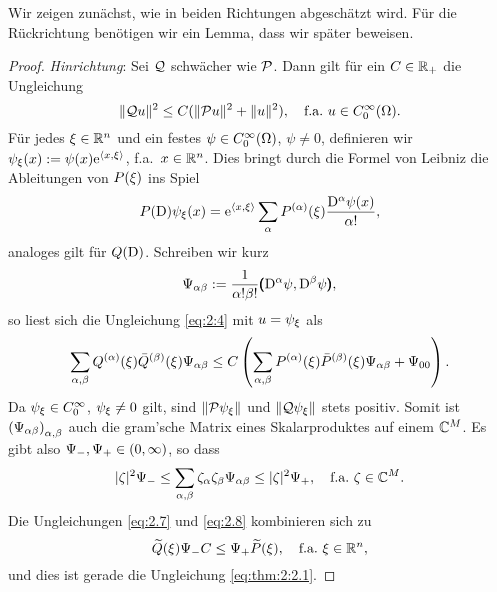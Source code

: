 Wir zeigen zunächst, wie in beiden Richtungen abgeschätzt wird.
Für die Rückrichtung benötigen wir ein Lemma,
dass wir später beweisen.

\begin{proof}
{\em Hinrichtung}:
Sei $\mathcal Q$ schwächer wie $\mathcal P$.
Dann gilt für ein $C\in\mathbb R_+$ die Ungleichung
\begin{equation}\label{eq:2:4}
\lVert\mathcal Q u\rVert^2\leq C(\lVert\mathcal P u\rVert^2+\lVert u\rVert^2),\quad\text{f.a.}~u\in C^\infty_0(\Omega).
\end{equation}
Für jedes $\xi\in\mathbb R^n$ und ein festes $\psi\in C^\infty_0(\Omega)$, $\psi\neq0$,
definieren wir $\psi_\xi(x):=\psi(x)\mathrm e^{\langle x,\xi\rangle}$, f.a.~$x\in\mathbb R^n$.
Dies bringt durch die Formel von Leibniz die Ableitungen von $P(\xi)$ ins Spiel
\begin{equation}\label{eq:2.5}
P(\mathrm D)\psi_\xi(x)=\mathrm e^{\langle x,\xi\rangle}\sum_\alpha P^{(\alpha)}(\xi)\frac{\mathrm D^\alpha\psi(x)}{\alpha!},
\end{equation}
analoges gilt für $Q(\mathrm D)$.
Schreiben wir kurz
\begin{equation}\label{eq:2.6}
\Psi_{\alpha\beta}:=\frac1{\alpha!\beta!}\pmb(\mathrm D^\alpha\psi,\mathrm D^\beta\psi\pmb),
\end{equation}
so liest sich die Ungleichung \eqref{eq:2:4} mit $u=\psi_\xi$ als
\begin{equation}\label{eq:2.7}
\sum_{\alpha,\beta}Q^{(\alpha)}(\xi)\bar{Q}^{(\beta)}(\xi)\Psi_{\alpha\beta}
\leq C\left(\sum_{\alpha,\beta}P^{(\alpha)}(\xi)\bar{P}^{(\beta)}(\xi)\Psi_{\alpha\beta}+\Psi_{00}\right).
\end{equation}
Da $\psi_\xi\in C^\infty_0$, $\psi_\xi\neq0$ gilt, sind $\lVert\mathcal P\psi_\xi\rVert$ und $\lVert\mathcal Q\psi_\xi\rVert$ stets positiv.
Somit ist $\left(\Psi_{\alpha\beta}\right)_{\alpha,\beta}$ auch die gram'sche Matrix
eines Skalarproduktes auf einem $\mathbb C^M$.
Es gibt also $\Psi_-,\Psi_+\in(0,\infty)$, so dass
\begin{equation}\label{eq:2.8}
\lvert\zeta\rvert^2\Psi_-\leq\sum_{\alpha,\beta}\zeta_\alpha\zeta_\beta\Psi_{\alpha\beta}\leq\lvert\zeta\rvert^2\Psi_+,
\quad\text{f.a.}~\zeta\in\mathbb C^M.
\end{equation}
Die Ungleichungen \eqref{eq:2.7} und \eqref{eq:2.8} kombinieren sich zu
\begin{equation}\label{eq:2.9}
\widetilde{Q}(\xi)\Psi_-C\leq\Psi_+\widetilde{P}(\xi),
\quad\text{f.a.}~\xi\in\mathbb R^n,
\end{equation}
und dies ist gerade die Ungleichung \eqref{eq:thm:2:2.1}.


\end{proof}
